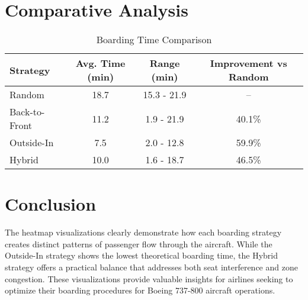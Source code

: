 \documentclass{article}
\begin{document}
\section{Comparative Analysis}

\begin{table}[htbp]
\centering
\begin{tabular}{lccc}
\toprule
\textbf{Strategy} & \textbf{Avg. Time (min)} & \textbf{Range (min)} & \textbf{Improvement vs Random} \\
\midrule
Random & 18.7 & 15.3 - 21.9 & -- \\
Back-to-Front & 11.2 & 1.9 - 21.9 & 40.1\% \\
Outside-In & 7.5 & 2.0 - 12.8 & 59.9\% \\
Hybrid & 10.0 & 1.6 - 18.7 & 46.5\% \\
\bottomrule
\end{tabular}
\caption{Boarding Time Comparison}
\label{tab:comparison}
\end{table}

\section{Conclusion}

The heatmap visualizations clearly demonstrate how each boarding strategy creates distinct patterns of passenger flow through the aircraft. While the Outside-In strategy shows the lowest theoretical boarding time, the Hybrid strategy offers a practical balance that addresses both seat interference and zone congestion. These visualizations provide valuable insights for airlines seeking to optimize their boarding procedures for Boeing 737-800 aircraft operations.
\end{document}
